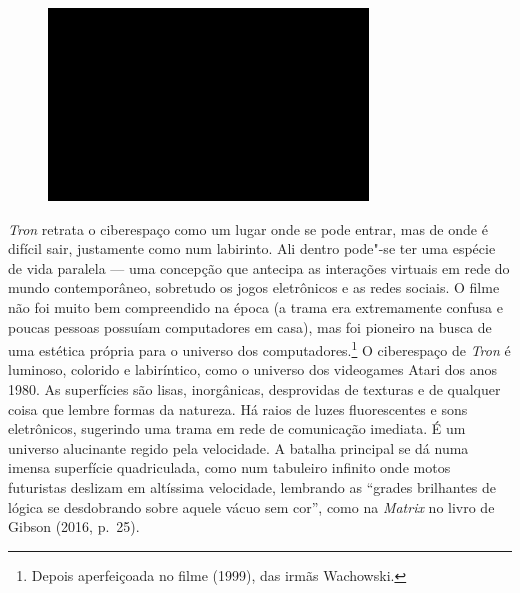 \begin{figure}[!ht]
\centering
 \includegraphics[width=85mm]{./imgs/im1.jpg}
\caption{\tiny{}}
\end{figure}

\emph{Tron} retrata o ciberespaço como um lugar onde se pode entrar, mas
de onde é difícil sair, justamente como num labirinto. Ali dentro
pode"-se ter uma espécie de vida paralela --- uma concepção que antecipa
as interações virtuais em rede do mundo contemporâneo, sobretudo os
jogos eletrônicos e as redes sociais. O filme não foi muito bem
compreendido na época (a trama era extremamente confusa e poucas pessoas
possuíam computadores em casa), mas foi pioneiro na busca de uma
estética própria para o universo dos computadores.\footnote{Depois
  aperfeiçoada no filme {} (1999), das irmãs Wachowski.} O
ciberespaço de \emph{Tron} é luminoso, colorido e labiríntico, como o
universo dos videogames Atari dos anos 1980. As superfícies são lisas,
inorgânicas, desprovidas de texturas e de qualquer coisa que lembre
formas da natureza. Há raios de luzes fluorescentes e sons eletrônicos,
sugerindo uma trama em rede de comunicação imediata. É um universo
alucinante regido pela velocidade. A batalha principal se dá numa imensa
superfície quadriculada, como num tabuleiro infinito onde motos
futuristas deslizam em altíssima velocidade, lembrando as ``grades
brilhantes de lógica se desdobrando sobre aquele vácuo sem cor'', como
na \emph{Matrix} no livro de Gibson (2016, p.~25).

